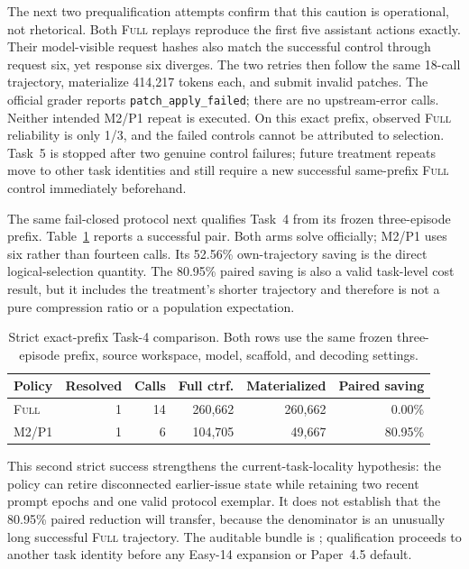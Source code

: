 \documentclass[11pt]{article}
\begin{document}
The next two prequalification attempts confirm that this caution is
operational, not rhetorical.  Both \textsc{Full} replays reproduce the first
five assistant actions exactly.  Their model-visible request hashes also match
the successful control through request six, yet response six diverges.  The
two retries then follow the same 18-call trajectory, materialize 414,217 tokens
each, and submit invalid patches.  The official grader reports
\texttt{patch\_apply\_failed}; there are no upstream-error calls.  Neither
intended M2/P1 repeat is executed.  On this exact prefix, observed
\textsc{Full} reliability is only 1/3, and the failed controls cannot be
attributed to selection.  Task~5 is stopped after two genuine control failures;
future treatment repeats move to other task identities and still require a new
successful same-prefix \textsc{Full} control immediately beforehand.

The same fail-closed protocol next qualifies Task~4 from its frozen
three-episode prefix.  Table~\ref{tab:task4-strict-prefix} reports a successful
pair.  Both arms solve officially; M2/P1 uses six rather than fourteen calls.
Its 52.56\% own-trajectory saving is the direct logical-selection quantity.
The 80.95\% paired saving is also a valid task-level cost result, but it includes
the treatment's shorter trajectory and therefore is not a pure compression
ratio or a population expectation.

\begin{table}[H]
\centering
\scriptsize
\caption{Strict exact-prefix Task-4 comparison.  Both rows use the same frozen
three-episode prefix, source workspace, model, scaffold, and decoding settings.}
\label{tab:task4-strict-prefix}
\begin{tabular}{lrrrrr}
\toprule
Policy & Resolved & Calls & Full ctrf. & Materialized & Paired saving \\
\midrule
\textsc{Full} & 1 & 14 & 260,662 & 260,662 & 0.00\% \\
M2/P1 & 1 & 6 & 104,705 & 49,667 & 80.95\% \\
\bottomrule
\end{tabular}
\end{table}

This second strict success strengthens the current-task-locality hypothesis:
the policy can retire disconnected earlier-issue state while retaining two
recent prompt epochs and one valid protocol exemplar.  It does not establish
that the 80.95\% paired reduction will transfer, because the denominator is an
unusually long successful \textsc{Full} trajectory.  The auditable bundle is
; qualification proceeds to
another task identity before any Easy-14 expansion or Paper~4.5 default.
\end{document}
